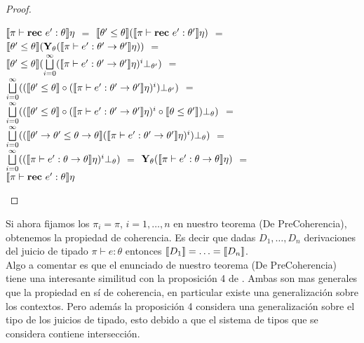 \begin{proof}
\begin{itemize}
\begin{itemize}
$\llbracket \pi \vdash \textbf{rec} \ e' : \theta \rrbracket \eta$ $=$ 
$\llbracket \theta' \leq \theta \rrbracket (\llbracket \pi \vdash \textbf{rec} \ e' : \theta' \rrbracket \eta)$ $=$\\
$\llbracket \theta' \leq \theta \rrbracket 
	(\textbf{Y}_{\theta} (\llbracket \pi \vdash e' : \theta' \rightarrow \theta' \rrbracket\eta))$ $=$\\
$\llbracket \theta' \leq \theta \rrbracket 
	(\bigsqcup\limits^{\infty}_{i=0} 
	(\llbracket \pi \vdash e' : \theta' \rightarrow \theta' \rrbracket\eta)^{i} \bot_{\theta'})$ $=$\\
$\bigsqcup\limits^{\infty}_{i=0} 
	((\llbracket \theta' \leq \theta \rrbracket \circ
	(\llbracket \pi \vdash e' : \theta' \rightarrow \theta' \rrbracket\eta)^{i}) \bot_{\theta'})$ $=$\\
$\bigsqcup\limits^{\infty}_{i=0} 
	((\llbracket \theta' \leq \theta \rrbracket 
	\circ
	(\llbracket \pi \vdash e' : \theta' \rightarrow \theta' \rrbracket\eta)^{i}
	\circ
	\llbracket \theta \leq \theta' \rrbracket 
	) \bot_{\theta})$ $=$\\
$\bigsqcup\limits^{\infty}_{i=0} 
	((\llbracket \theta' \rightarrow \theta' \leq \theta \rightarrow \theta \rrbracket 
	 (\llbracket \pi \vdash e' : \theta' \rightarrow \theta' \rrbracket\eta)^{i}
	) \bot_{\theta})$ $=$\\
$\bigsqcup\limits^{\infty}_{i=0} (
	(\llbracket \pi \vdash e' : \theta \rightarrow \theta \rrbracket\eta)^{i}
	\bot_{\theta})$ $=$ 
$\textbf{Y}_{\theta} (\llbracket \pi \vdash e' : \theta \rightarrow \theta \rrbracket\eta)$ $=$\\
$\llbracket \pi \vdash \textbf{rec} \ e' : \theta \rrbracket\eta$

\end{itemize}
\end{itemize}
\end{proof}

Si ahora fijamos los $\pi_i = \pi$, $i = 1,\ldots,n$ en nuestro teorema (De PreCoherencia), 
obtenemos la propiedad de coherencia. Es decir que dadas $D_1,\ldots,D_n$ derivaciones 
del juicio de tipado $\pi \vdash e : \theta$ entonces $\llbracket D_1 \rrbracket = \ldots = \llbracket D_n \rrbracket$.\\

Algo a comentar es que el enunciado de nuestro teorema (De PreCoherencia) tiene
una interesante similitud con la proposici\'on 4 de \cite{coherencereynolds}.
Ambas son mas generales que la propiedad en s\'i de coherencia, en particular
existe una generalizaci\'on sobre los contextos. Pero adem\'as la proposici\'on 4
considera una generalizaci\'on sobre el tipo de los juicios de tipado, esto debido 
a que el sistema de tipos que se considera contiene intersecci\'on.

